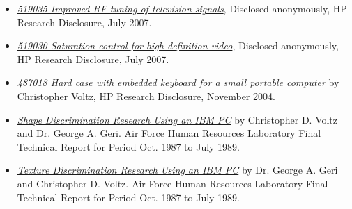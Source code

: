 \documentclass[10pt,letterpaper,oneside]{report}
\begin{document}
\begin{itemize}
  \item \href{http://voltz.ws/resume/RD519035.pdf}
    {\textit{519035 Improved RF tuning of television signals}}, Disclosed
    anonymously, HP Research Disclosure, July 2007.

  \item \href{http://voltz.ws/resume/RD519030.pdf}
    {\textit{519030 Saturation control for high definition video}}, Disclosed
    anonymously, HP Research Disclosure, July 2007.

  \item \href{http://voltz.ws/resume/RD487018.pdf}
    {\textit{487018 Hard case with embedded keyboard for a small portable
    computer}} by Christopher Voltz, HP Research Disclosure, November 2004.

  \item \href{http://www.dtic.mil/docs/citations/ADA219993}
    {\textit{Shape Discrimination Research Using an IBM PC}} by Christopher D.
    Voltz and Dr.  George A. Geri. Air Force Human Resources Laboratory Final
    Technical Report for Period Oct. 1987 to July 1989.

  \item \href{http://www.dtic.mil/docs/citations/ADA224347}
    {\textit{Texture Discrimination Research Using an IBM PC}} by Dr. George A.
    Geri and Christopher D. Voltz. Air Force Human Resources Laboratory Final
    Technical Report for Period Oct. 1987 to July 1989.
\end{itemize}
\end{document}
